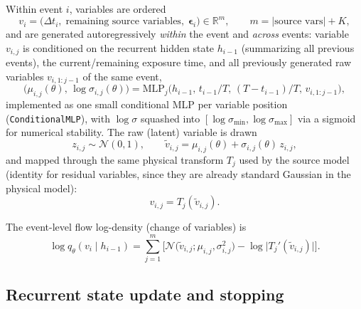 \documentclass[11pt]{article}
\newcommand{\R}{\mathbb{R}}
\newcommand{\Normal}{\mathcal{N}}
\newcommand{\dt}{\Delta t}
\begin{document}
Within event $i$, variables are ordered
\begin{equation}
v_i = \big(\dt_i,\; \text{remaining source variables},\; \bm\epsilon_i\big)
\in \R^{m}, \qquad m = |\text{source vars}| + K,
\end{equation}
and are generated autoregressively \emph{within} the event and \emph{across}
events: variable $v_{i,j}$ is conditioned on the recurrent hidden state
$h_{i-1}$ (summarizing all previous events), the current/remaining exposure
time, and all previously generated raw variables $v_{i,1:j-1}$ of the same
event,
\begin{equation}
\big(\mu_{i,j}(\theta),\, \log\sigma_{i,j}(\theta)\big)
=
\mathrm{MLP}_j\big(h_{i-1},\, t_{i-1}/T,\, (T-t_{i-1})/T,\, v_{i,1:j-1}\big),
\label{eq:flow-params}
\end{equation}
implemented as one small conditional MLP per variable position
(\texttt{ConditionalMLP}), with $\log\sigma$ squashed into
$[\log\sigma_{\min}, \log\sigma_{\max}]$ via a sigmoid for numerical
stability. The raw (latent) variable is drawn
\begin{equation}
z_{i,j} \sim \Normal(0,1), \qquad
\tilde v_{i,j} = \mu_{i,j}(\theta) + \sigma_{i,j}(\theta)\, z_{i,j},
\end{equation}
and mapped through the same physical transform $T_j$ used by the source
model (identity for residual variables, since they are already standard
Gaussian in the physical model):
\begin{equation}
v_{i,j} = T_j(\tilde v_{i,j}).
\end{equation}

The event-level flow log-density (change of variables) is
\begin{equation}
\log q_\theta(v_i \mid h_{i-1})
=
\sum_{j=1}^m \Big[\Normal\big(\tilde v_{i,j}; \mu_{i,j}, \sigma_{i,j}^2\big)
- \log\lvert T_j'(\tilde v_{i,j})\rvert \Big].
\label{eq:flow-event-density}
\end{equation}

\subsection{Recurrent state update and stopping}
\end{document}
